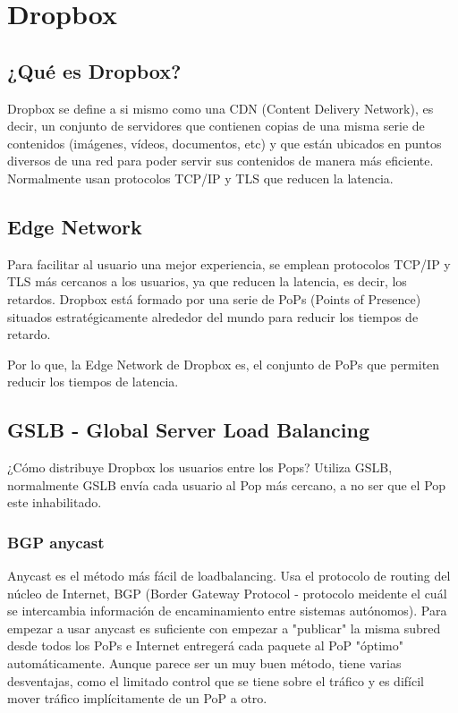 \section{Dropbox}

\subsection{¿Qué es Dropbox?}
Dropbox se define a si mismo como una CDN (Content Delivery Network), es decir, un conjunto de servidores que contienen copias de una misma serie de contenidos (imágenes, vídeos, documentos, etc) y que están ubicados en puntos diversos de una red para poder servir sus contenidos de manera más eficiente. Normalmente usan protocolos TCP/IP y TLS que reducen la latencia.
\subsection{Edge Network}
Para facilitar al usuario una mejor experiencia, se emplean protocolos TCP/IP y TLS más cercanos a los usuarios, ya que reducen la latencia, es decir, los retardos. Dropbox está formado por una serie de PoPs (Points of Presence) situados estratégicamente alrededor del mundo para reducir los tiempos de retardo.

Por lo que, la Edge Network de Dropbox es, el conjunto de PoPs que permiten reducir los tiempos de latencia.

\subsection{GSLB - Global Server Load Balancing}

¿Cómo distribuye Dropbox los usuarios entre los Pops? Utiliza GSLB, normalmente GSLB envía cada usuario al Pop más cercano, a no ser que el Pop este inhabilitado.

\subsubsection{BGP anycast}
Anycast es el método más fácil de loadbalancing. Usa el protocolo de routing del núcleo de Internet, BGP (Border Gateway Protocol - protocolo meidente el cuál se intercambia información de encaminamiento entre sistemas autónomos). Para empezar a usar anycast es suficiente con empezar a "publicar" la misma subred desde todos los PoPs e Internet entregerá cada paquete al PoP "óptimo" automáticamente. Aunque parece ser un muy buen método, tiene varias desventajas, como el limitado control que se tiene sobre el tráfico y es difícil mover tráfico implícitamente de un PoP a otro.

